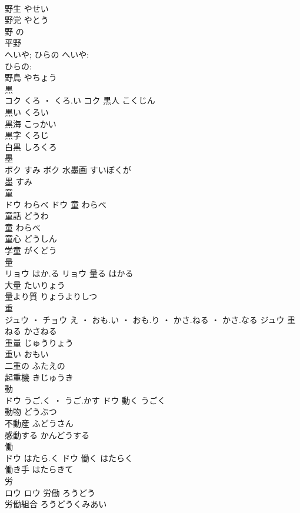 \documentclass[8pt]{extreport}
\begin{document}
\begin{CJK}{UTF8}{min}
\\	野生	やせい	
\\	野党	やとう	
\\	野	の	
\\	平野 
\\	へいや; ひらの	へいや: 
\\	ひらの: 
\\	野鳥	やちょう	
\\	黒	
\\	コク	くろ ・ くろ.い	コク	黒人	こくじん	
\\	黒い	くろい	
\\	黒海	こっかい	
\\	黒字	くろじ	
\\	白黒	しろくろ	
\\	墨	
\\	ボク	すみ	ボク	水墨画	すいぼくが	
\\	墨	すみ	
\\	童	
\\	ドウ	わらべ	ドウ	童	わらべ	
\\	童話	どうわ	
\\	童	わらべ	
\\	童心	どうしん	
\\	学童	がくどう	
\\	量	
\\	リョウ	はか.る	リョウ	量る	はかる	
\\	大量	たいりょう	
\\	量より質	りょうよりしつ	
\\	重	
\\	ジュウ ・ チョウ	え ・ おも.い ・ おも.り ・ かさ.ねる ・ かさ.なる	ジュウ	重ねる	かさねる	
\\	重量	じゅうりょう	
\\	重い	おもい	
\\	二重の	ふたえの	
\\	起重機	きじゅうき	
\\	動	
\\	ドウ	うご.く ・ うご.かす	ドウ	動く	うごく	
\\	動物	どうぶつ	
\\	不動産	ふどうさん	
\\	感動する	かんどうする	
\\	働	
\\	ドウ	はたら.く	ドウ	働く	はたらく	
\\	働き手	はたらきて	
\\	労	
\\	ロウ		ロウ	労働	ろうどう	
\\	労働組合	ろうどうくみあい	

\end{CJK}
\end{document}

